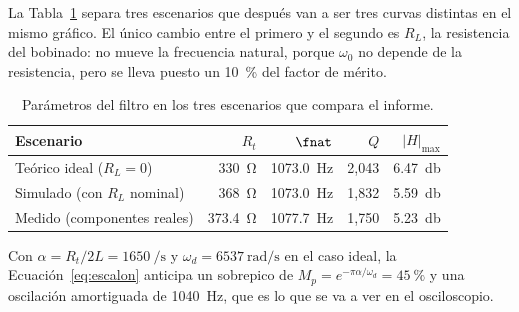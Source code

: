 La Tabla~\ref{tab:parametros} separa tres escenarios que después van a ser tres
curvas distintas en el mismo gráfico. El único cambio entre el primero y el
segundo es $R_L$, la resistencia del bobinado: no mueve la frecuencia natural,
porque $\omega_0$ no depende de la resistencia, pero se lleva puesto un
\SI{10}{\percent} del factor de mérito.

\begin{table}[H]
\centering
\caption{Parámetros del filtro en los tres escenarios que compara el informe.}
\label{tab:parametros}
\small
\begin{tabular}{lrrrr}
\toprule
\textbf{Escenario} & $R_t$ & $\fnat$ & $Q$ & $|H|_{\max}$ \\
\midrule
Teórico ideal ($R_L = 0$)      & \SI{330}{\ohm}   & \SI{1073.0}{\hertz} & 2,043 & \SI{6.47}{\decibel} \\
Simulado (con $R_L$ nominal)   & \SI{368}{\ohm}   & \SI{1073.0}{\hertz} & 1,832 & \SI{5.59}{\decibel} \\
Medido (componentes reales)    & \SI{373.4}{\ohm} & \SI{1077.7}{\hertz} & 1,750 & \SI{5.23}{\decibel} \\
\bottomrule
\end{tabular}
\end{table}

\noindent
Con $\alpha = R_t/2L = \SI{1650}{\per\second}$ y
$\omega_d = \SI{6537}{\radian\per\second}$ en el caso ideal, la
Ecuación~\eqref{eq:escalon} anticipa un sobrepico de
$M_p = e^{-\pi\alpha/\omega_d} = \SI{45}{\percent}$ y una oscilación amortiguada
de \SI{1040}{\hertz}, que es lo que se va a ver en el osciloscopio.
